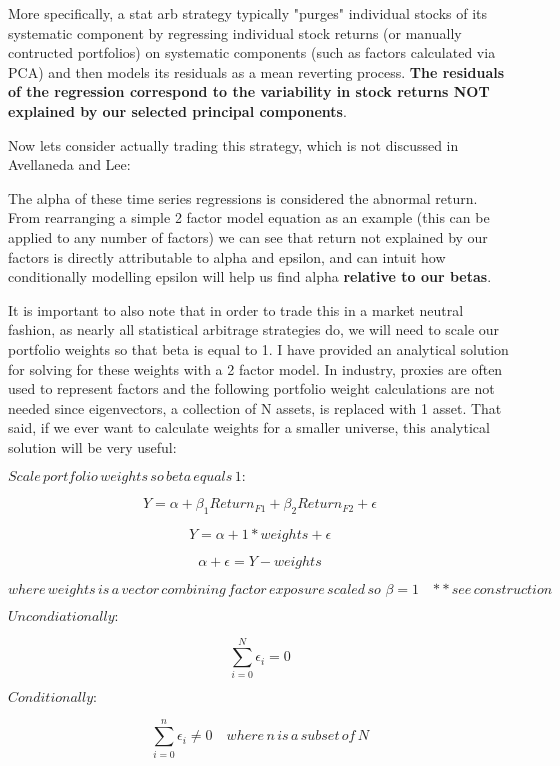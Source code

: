 \documentclass[11pt]{article}
\begin{document}
More specifically, a stat arb strategy typically "purges" individual
stocks of its systematic component by regressing individual stock
returns (or manually contructed portfolios) on systematic components
(such as factors calculated via PCA) and then models its residuals as a
mean reverting process. \textbf{The residuals of the regression
correspond to the variability in stock returns NOT explained by our
selected principal components}.

Now lets consider actually trading this strategy, which is not discussed
in Avellaneda and Lee:

The alpha of these time series regressions is considered the abnormal
return. From rearranging a simple 2 factor model equation as an example
(this can be applied to any number of factors) we can see that return
not explained by our factors is directly attributable to alpha and
epsilon, and can intuit how conditionally modelling epsilon will help us
find alpha \textbf{relative to our betas}.

It is important to also note that in order to trade this in a market
neutral fashion, as nearly all statistical arbitrage strategies do, we
will need to scale our portfolio weights so that beta is equal to 1. I
have provided an analytical solution for solving for these weights with
a 2 factor model. In industry, proxies are often used to represent
factors and the following portfolio weight calculations are not needed
since eigenvectors, a collection of N assets, is replaced with 1 asset.
That said, if we ever want to calculate weights for a smaller universe,
this analytical solution will be very useful:

    \(Scale \, portfolio \, weights \, so \, beta \, equals \, 1:\)

\[ Y = \alpha + \beta_{1} Return_{F1} + \beta_{2} Return_{F2} + \epsilon\]

\[ Y = \alpha + 1*weights + \epsilon\]

\[ \alpha + \epsilon = Y - weights \]

\[ where \, weights \, is \, a \, vector \, combining \, factor \, exposure \, scaled \, so \,\, \beta =1 \quad {**} see \, construction  \]

\({Uncondiationally:}\)

\[\sum_{i=0}^N \epsilon_{i} = 0\]

\({Conditionally:}\)

\[\sum_{i=0}^n \epsilon_{i} \not = 0  \quad where \, n \, is \, a \, subset\, of\,N \]
\end{document}
